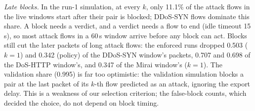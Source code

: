 \emph{Late blocks.} In the run-1 simulation, at every $k$, only 11.1\% of the attack flows in the live windows start after their pair is blocked; DDoS-SYN flows dominate this share. A block needs a verdict, and a verdict needs a flow to end (idle timeout 15\,s), so most attack flows in a 60\,s window arrive before any block can act. Blocks still cut the later packets of long attack flows: the enforced runs dropped 0.503 ($k=1$) and 0.342 (policy) of the DDoS-SYN window's packets, 0.707 and 0.698 of the DoS-HTTP window's, and 0.347 of the Mirai window's ($k=1$). The validation share (0.995) is far too optimistic: the validation simulation blocks a pair at the last packet of its $k$-th flow predicted as an attack, ignoring the export delay. This is a weakness of our selection criterion; the false-block counts, which decided the choice, do not depend on block timing.
